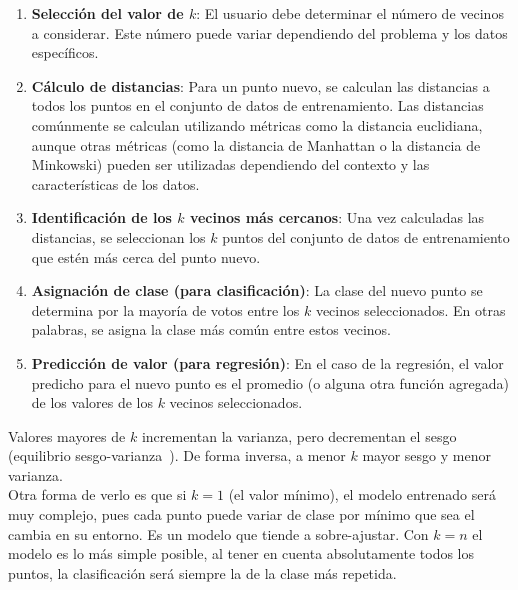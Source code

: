 \begin{enumerate}
    \item \textbf{Selección del valor de $k$}: El usuario debe determinar el número de vecinos a considerar. Este número puede variar dependiendo del problema y los datos específicos.

    \item \textbf{Cálculo de distancias}: Para un punto nuevo, se calculan las distancias a todos los puntos en el conjunto de datos de entrenamiento. Las distancias comúnmente se calculan utilizando métricas como la distancia euclidiana, aunque otras métricas (como la distancia de Manhattan o la distancia de Minkowski) pueden ser utilizadas dependiendo del contexto y las características de los datos.

    \item \textbf{Identificación de los $k$ vecinos más cercanos}: Una vez calculadas las distancias, se seleccionan los $k$ puntos del conjunto de datos de entrenamiento que estén más cerca del punto nuevo.

    \item \textbf{Asignación de clase (para clasificación)}: La clase del nuevo punto se determina por la mayoría de votos entre los $k$ vecinos seleccionados. En otras palabras, se asigna la clase más común entre estos vecinos.

    \item \textbf{Predicción de valor (para regresión)}: En el caso de la regresión, el valor predicho para el nuevo punto es el promedio (o alguna otra función agregada) de los valores de los $k$ vecinos seleccionados.
\end{enumerate}

Valores mayores de $k$ incrementan la varianza, pero decrementan el sesgo (equilibrio sesgo-varianza~\cite{Mostafa2012}). De forma inversa, a menor $k$ mayor sesgo y menor varianza.\\[6pt]
Otra forma de verlo es que si $k=1$ (el valor mínimo), el modelo entrenado será muy complejo, pues cada punto puede variar de clase por mínimo que sea el cambia en su entorno. Es un modelo que tiende a sobre-ajustar. Con $k=n$ el modelo es lo más simple posible, al tener en cuenta absolutamente todos los puntos, la clasificación será siempre la de la clase más repetida.